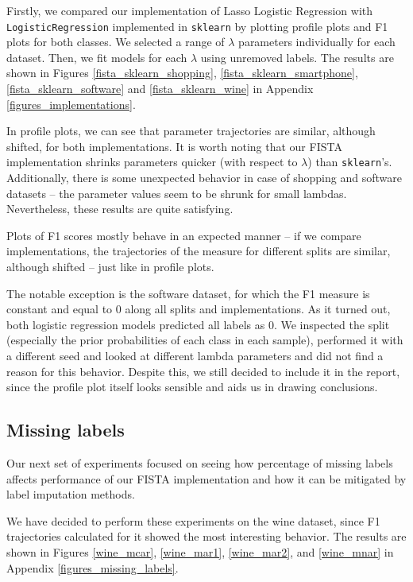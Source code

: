\documentclass{article}
\begin{document}
Firstly, we compared our implementation of Lasso Logistic Regression with \verb|LogisticRegression| implemented in \verb|sklearn| by plotting profile plots and F1 plots for both classes. We selected a range of $\lambda$ parameters individually for each dataset. Then, we fit models for each $\lambda$ using unremoved labels. The results are shown in Figures \ref{fista_sklearn_shopping}, \ref{fista_sklearn_smartphone}, \ref{fista_sklearn_software} and \ref{fista_sklearn_wine} in Appendix \ref{figures_implementations}.

In profile plots, we can see that parameter trajectories are similar, although shifted, for both implementations. It is worth noting that our FISTA implementation shrinks parameters quicker (with respect to $\lambda$) than \verb|sklearn|'s. Additionally, there is some unexpected behavior in case of shopping and software datasets -- the parameter values seem to be shrunk for small lambdas. Nevertheless, these results are quite satisfying.

Plots of F1 scores mostly behave in an expected manner -- if we compare implementations, the trajectories of the measure for different splits are similar, although shifted -- just like in profile plots.

The notable exception is the software dataset, for which the F1 measure is constant and equal to 0 along all splits and implementations. As it turned out, both logistic regression models predicted all labels as 0. We inspected the split (especially the prior probabilities of each class in each sample), performed it with a different seed and looked at different lambda parameters and did not find a reason for this behavior. Despite this, we still decided to include it in the report, since the profile plot itself looks sensible and aids us in drawing conclusions.

\subsection{Missing labels}

Our next set of experiments focused on seeing how percentage of missing labels affects performance of our FISTA implementation and how it can be mitigated by label imputation methods.

We have decided to perform these experiments on the wine dataset, since F1 trajectories calculated for it showed the most interesting behavior. The results are shown in Figures \ref{wine_mcar}, \ref{wine_mar1}, \ref{wine_mar2}, and \ref{wine_mnar} in Appendix \ref{figures_missing_labels}. 
\end{document}
